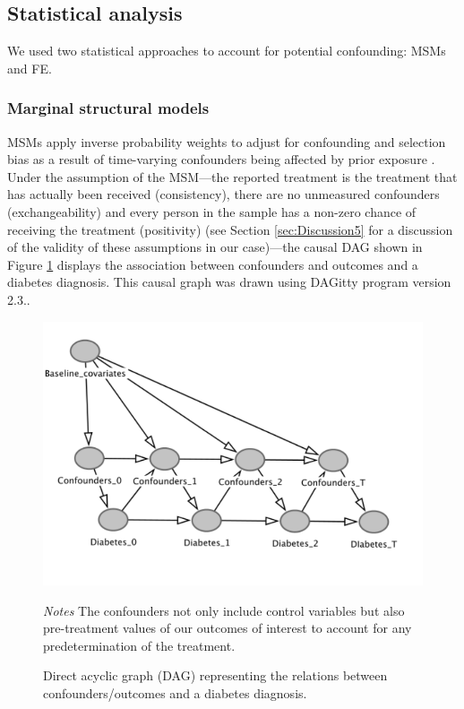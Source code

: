 \subsection*{Statistical analysis}


We used two statistical approaches to account for potential confounding: \acfp{MSM} and \acf{FE}. 

\subsubsection*{Marginal structural models}

\acp{MSM} apply inverse probability weights to adjust for confounding and selection bias as a result of time-varying confounders being affected by prior exposure \autocite{Robins2000}. Under the assumption of the \ac{MSM}\autocite{Robins2000}---the reported treatment is the treatment that has actually been received (consistency), there are no unmeasured confounders (exchangeability) and every person in the sample has a non-zero chance of receiving the treatment (positivity) (see Section \ref{sec:Discussion5} for a discussion of the validity of these assumptions in our case)---the causal DAG shown in Figure \ref{fig:DAG} displays the association between confounders and outcomes and a diabetes diagnosis. This causal graph was drawn using DAGitty program version 2.3.\autocite{Textor2011}.

\begin{figure}
\begin{center}
\caption{\label{fig:DAG} Direct acyclic graph (DAG) representing the relations between confounders/outcomes and a diabetes diagnosis.}
\includegraphics[scale=0.7]{Chapter5/Figures/dag}
\end{center}
\footnotesize{\textit{Notes} The confounders not only include control variables but also pre-treatment values of our outcomes of interest to account for any predetermination of the treatment.}

\end{figure}


